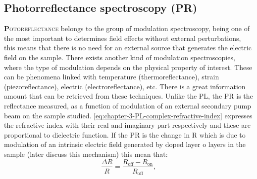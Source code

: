 \subsection{Photorreflectance spectroscopy (PR)}
\label{subsec:chapter-3-pr}
\vspace{-10mm} 
\lettrine[lines=3, lraise=.1, nindent=0mm, slope=0mm]{\textbf{P}}{otoreflectance} belongs to the group of modulation spectroscopy, being one of the most important to determines field effects without external perturbations, this means that there is no need for an external source that generates the electric field on the sample. 
There exists another kind of modulation spectroscopies, where the type of modulation depends on the physical property of interest. These can be phenomena linked with temperature (thermoreflectance), strain (piezoreflectance), electric (electroreflectance), etc. There is a great information amount that can be retrieved from these techniques. Unlike the \gls{PL}, the \gls{PR} is the reflectance measured, as a function of modulation of an external secondary pump beam on the sample studied. \cref{eq:chapter-3-PL-complex-refractive-index} expresses the refractive index with their real and imaginary part respectively and these are proportional to dielectric function. If the \gls{PR}
is the change in \gls{R} which is due to modulation of an intrinsic electric field generated by doped layer o layers in the sample (later discuss this mechanism) this mean that:
\begin{equation}
	\dfrac{\Delta R}{R} = \dfrac{R_{\mathrm{off}}-R_{\mathrm{on}}}{R_{\mathrm{off}}},
	\label{eq:chapter-3-PR-mechanis}
\end{equation}


